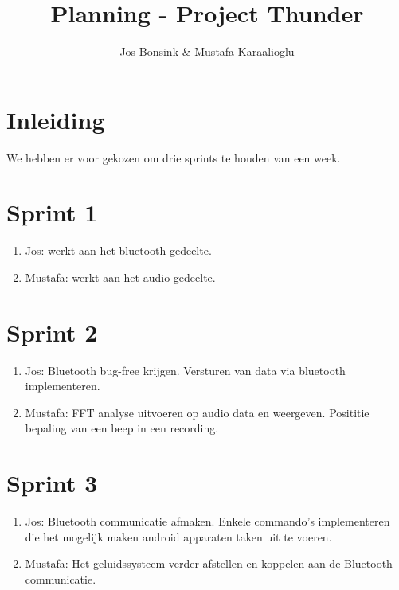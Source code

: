 \documentclass[12pt]{article}
\author{Jos Bonsink \& Mustafa Karaalioglu}
\begin{document}
\title{Planning - Project Thunder}
\maketitle

\section*{Inleiding}
We hebben er voor gekozen om drie sprints te houden van een week.

\section*{Sprint 1}
\begin{enumerate}
\item Jos: werkt aan het bluetooth gedeelte.
\item Mustafa: werkt aan het audio gedeelte.
\end{enumerate}

\section*{Sprint 2}
\begin{enumerate}
\item Jos: Bluetooth bug-free krijgen. Versturen van data via bluetooth implementeren.
\item Mustafa: FFT analyse uitvoeren op audio data en weergeven. Posititie bepaling van een beep in een recording.
\end{enumerate}

\section*{Sprint 3}
\begin{enumerate}
\item Jos: Bluetooth communicatie afmaken. Enkele commando's implementeren die het mogelijk maken android apparaten taken uit te voeren. 
\item Mustafa: Het geluidssysteem verder afstellen en koppelen aan de Bluetooth communicatie. 
\end{enumerate}
\end{document}

